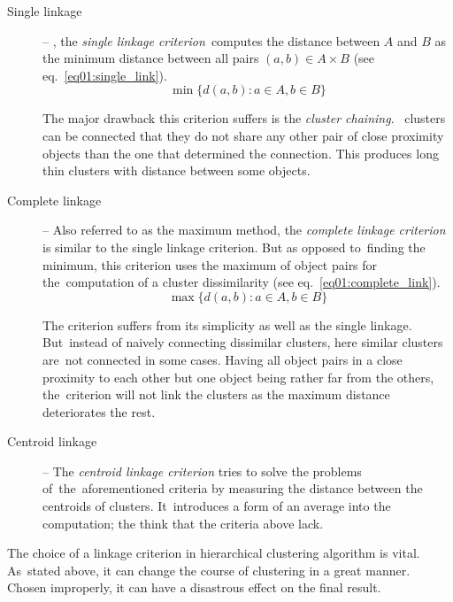 \begin{description}
	\item[Single linkage] -- , the \emph{single linkage criterion}\ computes the distance between $A$ and $B$ as the minimum distance between all pairs $(a,b) \in A\times B$ (see eq.~\ref{eq01:single_link}).
	\begin{equation}\label{eq01:single_link}
	\min\{d(a,b) : a \in A, b \in B\}
	\end{equation}
	
	The major drawback this criterion suffers is the \emph{cluster chaining}. \ clusters can be connected that they do not share any other pair of close proximity objects than the one that determined the connection. This produces long thin clusters with  distance between some objects.
	
	\item[Complete linkage] -- Also referred to as the maximum method, the \emph{complete linkage criterion} is similar to the single linkage criterion. But as opposed to~finding the minimum, this criterion uses the maximum of object pairs for the~computation of a cluster dissimilarity (see eq.~\ref{eq01:complete_link}). 
	\begin{equation}\label{eq01:complete_link}
	\max\{d(a,b) : a \in A, b \in B\}
	\end{equation}
	
	The criterion suffers from its simplicity as well as the single linkage. But~instead of naively connecting dissimilar clusters, here similar clusters are~not connected in some cases. Having all object pairs in a close proximity to each other but one object being rather far from the others, the~criterion will not link the clusters as the maximum distance deteriorates the rest.
	
	\item[Centroid linkage] -- The \emph{centroid linkage criterion} tries to solve the problems of~the~aforementioned criteria by measuring the distance between the centroids of clusters. It~introduces a form of an average into the computation; the think that the criteria above lack.
\end{description}

The choice of a linkage criterion in hierarchical clustering algorithm is vital. As~stated above, it can change the course of clustering in a great manner. Chosen improperly, it can have a disastrous effect on the final result.

